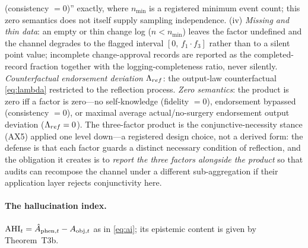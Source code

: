 (consistency $=0$)'' exactly, where $n_{\min}$ is a registered minimum event
count; this zero semantics does not itself supply sampling independence.
(iv)
\emph{Missing and thin data}: an empty or thin change log ($n<n_{\min}$)
leaves the factor undefined and the channel degrades to the flagged interval
$[0,\,f_1\cdot f_3]$ rather than to a silent point value; incomplete
change-approval records are reported as the completed-record fraction
together with the logging-completeness ratio, never silently. \emph{Counterfactual endorsement deviation} $\Lambda_{ref}$: the output-law
counterfactual \eqref{eq:lambda} restricted to the reflection process.
\emph{Zero semantics}: the product is zero iff a factor is zero---no
self-knowledge (fidelity $=0$), endorsement bypassed (consistency $=0$), or
maximal average actual/no-surgery endorsement output deviation
($\Lambda_{ref}=0$). The
three-factor product is the conjunctive-necessity stance (AX5) applied one
level down---a registered design choice, not a derived form: the defense is
that each factor guards a distinct necessary condition of reflection, and the
obligation it creates is to \emph{report the three factors alongside the
product} so that audits can recompose the channel under a different
sub-aggregation if their application layer rejects conjunctivity here.

\paragraph{The hallucination index.} $\mathrm{AHI}_t=\hat{A}_{\mathrm{phen},t}-A_{\mathrm{obj},t}$ as in
\eqref{eq:ai}; its epistemic content is given by Theorem~T3b.


